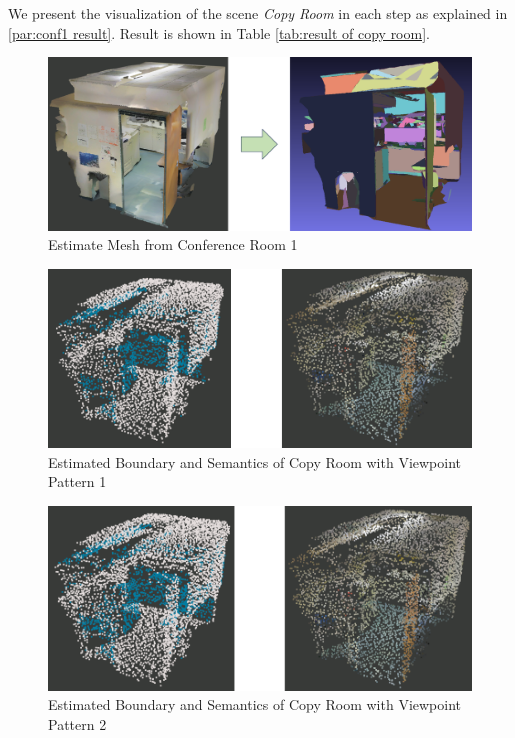 \documentclass[11pt, a4paper,oneside,chapterprefix=false]{scrbook}
\begin{document}
We present the visualization of the scene \textit{Copy Room} in each step as explained in \ref{par:conf1 result}. Result is shown in Table \ref{tab:result of copy room}.

\begin{figure}[H]
    \centering
    \includegraphics*[width=1.0\textwidth]{figures/estimate copy.png}
    \caption{Estimate Mesh from Conference Room 1}
    \label{fig:estimate mesh from copy room}
\end{figure}

\begin{figure}[H]
    \centering
    \includegraphics*[width=1.0\textwidth]{figures/copy 0.png}
    \caption{Estimated Boundary and Semantics of Copy Room with Viewpoint Pattern 1}
    \label{fig:copy 0}
\end{figure}

\begin{figure}[H]
    \centering
    \includegraphics*[width=1.0\textwidth]{figures/copy 4.png}
    \caption{Estimated Boundary and Semantics of Copy Room with Viewpoint Pattern 2}
    \label{fig:copy 4}
\end{figure}
\end{document}
